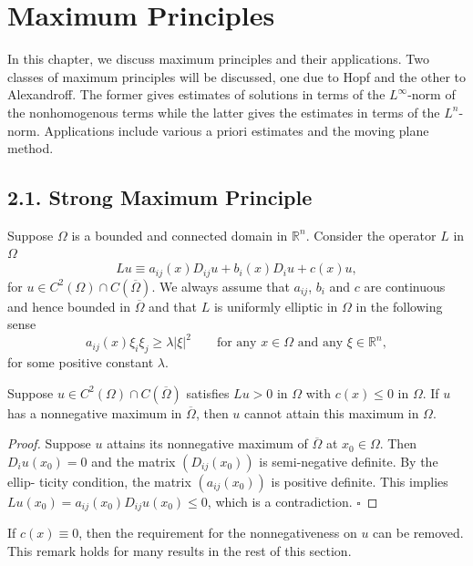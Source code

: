 \chapter{Maximum Principles}

In this chapter, we discuss maximum principles and their applications. Two
classes of maximum principles will be discussed, one due to Hopf and the other
to Alexandroff. The former gives estimates of solutions in terms of the
$L^\infty$-norm of the nonhomogenous terms while the latter gives the estimates in terms of the
$L^n$-norm. Applications include various a priori estimates and the moving plane
method.

\section*{2.1. Strong Maximum Principle}

Suppose $\Omega$ is a bounded and connected domain in $\mathbb{R}^n$. Consider the operator
$L$ in $\Omega$
\[
Lu \equiv a_{ij}(x)D_{ij}u + b_i(x)D_iu + c(x)u,
\]
for $u \in C^2(\Omega) \cap C(\overline{\Omega})$. We always assume that $a_{ij}$, $b_i$ and $c$ are continuous and
hence bounded in $\overline{\Omega}$ and that $L$ is uniformly elliptic in $\Omega$ in the following sense
\[
a_{ij}(x)\xi_i\xi_j \ge \lambda |\xi|^2 \qquad \text{for any } x \in \Omega \text{ and any } \xi \in \mathbb{R}^n,
\]
for some positive constant $\lambda$.

\begin{lemma}\label{hanlin:maxprin-lemma-2-1}
Suppose $u \in C^2(\Omega)\cap C(\overline{\Omega})$ satisfies $Lu > 0$ in $\Omega$ with $c(x) \le 0$ in
$\Omega$. If $u$ has a nonnegative maximum in $\overline{\Omega}$, then $u$ cannot attain this maximum in
$\Omega$.
\end{lemma}
\begin{proof}
\sketch
Suppose $u$ attains its nonnegative maximum of $\overline{\Omega}$ at $x_0 \in \Omega$. Then
$D_iu(x_0)=0$ and the matrix $(D_{ij}(x_0))$ is semi-negative definite. By the ellip-
ticity condition, the matrix $(a_{ij}(x_0))$ is positive definite. This implies $Lu(x_0) =
a_{ij}(x_0)D_{ij}u(x_0) \le 0$, which is a contradiction. $\square$
\end{proof}

\begin{remark}\label{hanlin:maxprin-remark-2-2}
If $c(x) \equiv 0$, then the requirement for the nonnegativeness on $u$
can be removed. This remark holds for many results in the rest of this section.
\end{remark}


